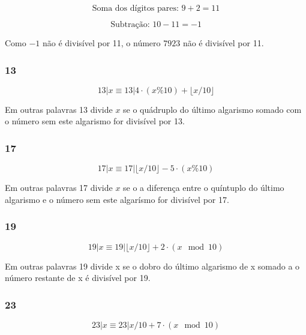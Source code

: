 \[
\text{Soma dos dígitos pares: } 9 + 2 = 11
\]

\[
\text{Subtração: } 10 - 11 = -1
\]

Como \(-1\) não é divisível por 11, o número \(7923\) não é divisível por 11.

\subsubsection{13}

\begin{equation}
    13 | x \equiv 13 | 4 \cdot (x\%10) + \lfloor x/10 \rfloor
\end{equation}

Em outras palavras 13 divide $x$ se o quádruplo do último algarismo somado com o número sem este algarismo for divisível por 13.

\subsubsection{17}

\begin{equation}
    17 | x \equiv 17 |  \lfloor x/10 \rfloor - 5 \cdot (x \% 10)
\end{equation}

Em outras palavras 17 divide $x$ se o a diferença entre o quíntuplo do último algarismo e o número sem este algarísmo for divisível por 17.

\subsubsection{19}

\begin{equation}
    19 | x \equiv 19 | \lfloor x / 10 \rfloor + 2 \cdot (x \mod 10)
\end{equation}

Em outras palavras 19 divide x se o dobro do último algarismo de x somado a o número restante de x é divisível por 19.

\subsubsection{23}

\begin{equation}
    23 | x \equiv 23 |  x / 10  + 7 \cdot (x \mod 10)  
\end{equation}

